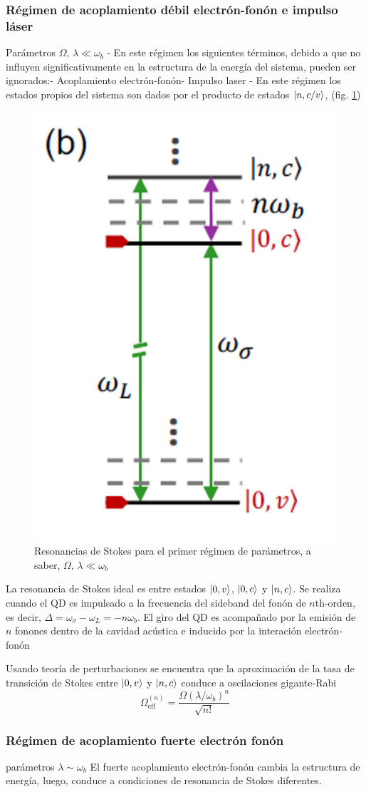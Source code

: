 \documentclass[../main.tex]{subfiles}
\begin{document}
\subsubsection{Régimen de acoplamiento débil electrón-fonón e impulso láser}
Parámetros $\Omega,\, \lambda \ll \omega_b$
- En este régimen los siguientes términos, debido a que no influyen significativamente en la estructura de la energía del sistema, pueden ser ignorados:- Acoplamiento electrón-fonón- Impulso laser
- En este régimen los estados propios del sistema son dados por el producto de estados $\ket{n,c/v}$, (fig. \ref{fig:resonancesstokes1})
\begin{figure}[th]
	\centering
	\includegraphics[width=0.25\linewidth]{img/resonancesStokes1}
	\caption{Resonancias de Stokes para el primer régimen de parámetros, a saber,  $\Omega,\, \lambda \ll \omega_b$ \parencite{Bin2020}}
	\label{fig:resonancesstokes1}
\end{figure}

La resonancia de Stokes ideal es entre estados $\ket{0,v}$, $\ket{0,c}$ y $\ket{n,c}$. Se realiza cuando el QD es impulsado a la frecuencia del sideband del fonón de $n$th-orden, es decir, $\Delta = \omega_\sigma - \omega_L = -n\omega_b$. El giro del QD es acompañado por la emisión de $n$ fonones dentro de la cavidad acústica e inducido por la interación electrón-fonón

Usando teoría de perturbaciones se encuentra que la aproximación de la tasa de transición de Stokes entre $\ket{0,v}$ y $\ket{n,c}$ conduce a oscilaciones gigante-Rabi \parencite{Bin2020}
\begin{equation}\label{eq:effRabi1}
	\Omega_\text{eff}^{(n)} = \frac{\Omega(\lambda/\omega_b)^n}{\sqrt{n!}}
\end{equation}

\subsubsection{Régimen de acoplamiento fuerte electrón fonón}
parámetros $\lambda \sim \omega_b$
El fuerte acoplamiento electrón-fonón cambia la estructura de energía, luego, conduce a condiciones de resonancia de Stokes diferentes.
\end{document}
